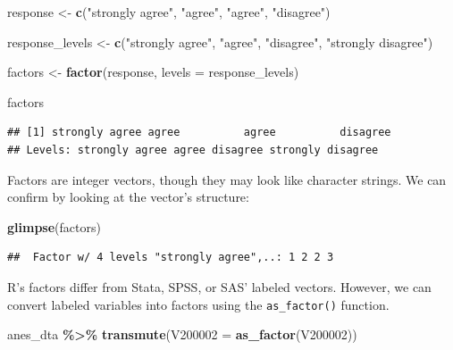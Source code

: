 \documentclass[
]{krantz}
\makeatletter
\newenvironment{Shaded}{\begin{snugshade}}{\end{snugshade}}
\newcommand{\AttributeTok}[1]{\textcolor[rgb]{0.27,0.27,0.27}{#1}}
\newcommand{\FunctionTok}[1]{\textcolor[rgb]{0.27,0.27,0.27}{\textbf{#1}}}
\newcommand{\NormalTok}[1]{#1}
\newcommand{\OtherTok}[1]{\textcolor[rgb]{0.37,0.37,0.37}{#1}}
\newcommand{\SpecialCharTok}[1]{\textcolor[rgb]{0.43,0.43,0.43}{\textbf{#1}}}
\newcommand{\StringTok}[1]{\textcolor[rgb]{0.5,0.5,0.5}{#1}}
\newenvironment{kframe}{%
\medskip{}
\setlength{\fboxsep}{.8em}
 \def\at@end@of@kframe{}%
 \ifinner\ifhmode%
  \def\at@end@of@kframe{\end{minipage}}%
  \begin{minipage}{\columnwidth}%
 \fi\fi%
 \def\FrameCommand##1{\hskip\@totalleftmargin \hskip-\fboxsep
 \colorbox{shadecolor}{##1}\hskip-\fboxsep
     \hskip-\linewidth \hskip-\@totalleftmargin \hskip\columnwidth}%
 \MakeFramed {\advance\hsize-\width
   \@totalleftmargin\z@ \linewidth\hsize
   \@setminipage}}%
 {\par\unskip\endMakeFramed%
 \at@end@of@kframe}
\renewenvironment{Shaded}{\begin{kframe}}{\end{kframe}}
\makeatother
\begin{document}
\begin{Shaded}
\begin{Highlighting}[]
\NormalTok{response }\OtherTok{\textless{}{-}}
  \FunctionTok{c}\NormalTok{(}\StringTok{"strongly agree"}\NormalTok{, }\StringTok{"agree"}\NormalTok{, }\StringTok{"agree"}\NormalTok{, }\StringTok{"disagree"}\NormalTok{)}

\NormalTok{response\_levels }\OtherTok{\textless{}{-}}
  \FunctionTok{c}\NormalTok{(}\StringTok{"strongly agree"}\NormalTok{, }\StringTok{"agree"}\NormalTok{, }\StringTok{"disagree"}\NormalTok{, }\StringTok{"strongly disagree"}\NormalTok{)}

\NormalTok{factors }\OtherTok{\textless{}{-}} \FunctionTok{factor}\NormalTok{(response, }\AttributeTok{levels =}\NormalTok{ response\_levels)}

\NormalTok{factors}
\end{Highlighting}
\end{Shaded}

\begin{verbatim}
## [1] strongly agree agree          agree          disagree      
## Levels: strongly agree agree disagree strongly disagree
\end{verbatim}

Factors are integer vectors, though they may look like character strings. We can confirm by looking at the vector's structure:

\begin{Shaded}
\begin{Highlighting}[]
\FunctionTok{glimpse}\NormalTok{(factors)}
\end{Highlighting}
\end{Shaded}

\begin{verbatim}
##  Factor w/ 4 levels "strongly agree",..: 1 2 2 3
\end{verbatim}

R's factors differ from Stata, SPSS, or SAS' labeled vectors. However, we can convert labeled variables into factors using the \texttt{as\_factor()} function.

\begin{Shaded}
\begin{Highlighting}[]
\NormalTok{anes\_dta }\SpecialCharTok{\%\textgreater{}\%}
  \FunctionTok{transmute}\NormalTok{(}\AttributeTok{V200002 =} \FunctionTok{as\_factor}\NormalTok{(V200002))}
\end{Highlighting}
\end{Shaded}
\end{document}
